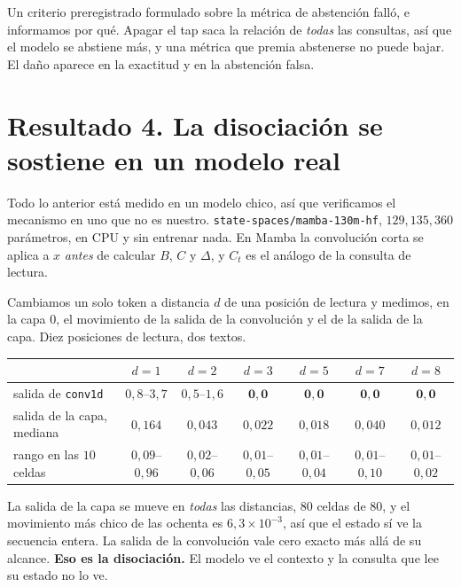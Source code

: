\documentclass[11pt,a4paper]{article}
\begin{document}
Un criterio preregistrado formulado sobre la métrica de abstención falló, e informamos por qué. Apagar
el tap saca la relación de \emph{todas} las consultas, así que el modelo se abstiene más, y una
métrica que premia abstenerse no puede bajar. El daño aparece en la exactitud y en la abstención
falsa.

\section{Resultado 4. La disociación se sostiene en un modelo real}

Todo lo anterior está medido en un modelo chico, así que verificamos el mecanismo en uno que no es
nuestro. \texttt{state-spaces/mamba-130m-hf}, $129{,}135{,}360$ parámetros, en CPU y sin entrenar
nada. En Mamba la convolución corta se aplica a $x$ \emph{antes} de calcular $B$, $C$ y $\Delta$, y
$C_t$ es el análogo de la consulta de lectura.

Cambiamos un solo token a distancia $d$ de una posición de lectura y medimos, en la capa $0$, el
movimiento de la salida de la convolución y el de la salida de la capa. Diez posiciones de lectura,
dos textos.

\begin{center}
\begin{tabular}{lcccccc}
\toprule
& $d{=}1$ & $d{=}2$ & $d{=}3$ & $d{=}5$ & $d{=}7$ & $d{=}8$ \\
\midrule
salida de \texttt{conv1d} & $0{,}8$--$3{,}7$ & $0{,}5$--$1{,}6$ & $\mathbf{0{,}0}$ & $\mathbf{0{,}0}$ & $\mathbf{0{,}0}$ & $\mathbf{0{,}0}$ \\
salida de la capa, mediana & $0{,}164$ & $0{,}043$ & $0{,}022$ & $0{,}018$ & $0{,}040$ & $0{,}012$ \\
\quad rango en las $10$ celdas & $0{,}09$--$0{,}96$ & $0{,}02$--$0{,}06$ & $0{,}01$--$0{,}05$ & $0{,}01$--$0{,}04$ & $0{,}01$--$0{,}10$ & $0{,}01$--$0{,}02$ \\
\bottomrule
\end{tabular}
\end{center}

La salida de la capa se mueve en \emph{todas} las distancias, $80$ celdas de $80$, y el movimiento más
chico de las ochenta es $6{,}3\!\times\!10^{-3}$, así que el estado sí ve la secuencia entera. La salida de la convolución vale cero exacto más allá de su alcance.
\textbf{Eso es la disociación.} El modelo ve el contexto y la consulta que lee su estado no lo ve.
\end{document}

